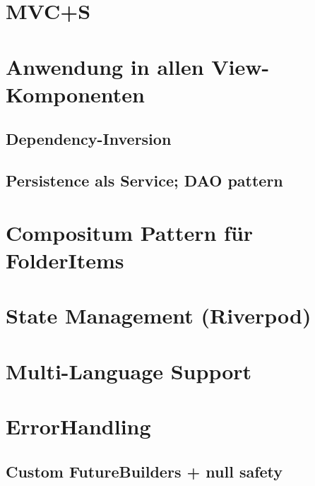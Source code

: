 \section{MVC+S}


\section{Anwendung in allen View-Komponenten}


\subsection{Dependency-Inversion}


\subsection{Persistence als Service; DAO pattern}


\section{Compositum Pattern für FolderItems}


\section{State Management (Riverpod)}


\section{Multi-Language Support}


\section{ErrorHandling}


\subsection{Custom FutureBuilders + null safety}